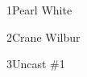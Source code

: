 \parbox[t]{4.75in}{1\hfil\break Pearl White}\hfil\break\vskip 0.25in
\parbox[t]{4.75in}{2\hfil\break Crane Wilbur}\hfil\break\vskip 0.25in
\parbox[t]{4.75in}{3\hfil\break Uncast \#1}\hfil\break\vskip 0.25in
